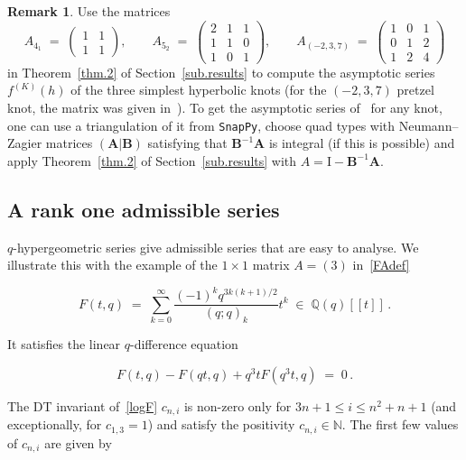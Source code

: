 \documentclass[12pt,reqno]{amsart}
\theoremstyle{definition}
\newtheorem{remark}[proposition]{Remark}
\def\BN{\mathbb N}
\def\BQ{\mathbb Q}
\def\be{\begin{equation}}
\def\ee{\end{equation}}
\def\={\;=\;}
\def\inn{\;\in\;}
\def\Phitof{f}
\begin{document}
\begin{remark}
\label{rem.knots}
Use the matrices
\be
\label{3knots}
A_{4_1} \= \begin{pmatrix} 1 & 1 \\ 1 & 1 \end{pmatrix},
\qquad
A_{5_2} \= \begin{pmatrix} 2 & 1 & 1 \\ 1 & 1 & 0 \\ 1 & 0 & 1 \end{pmatrix},
\qquad
A_{(-2,3,7)} \=
\begin{pmatrix} 1 & 0 & 1 \\ 0 & 1 & 2 \\ 1 & 2 & 4 \end{pmatrix}
\ee
in Theorem~\ref{thm.2} of Section~\ref{sub.results} to compute the asymptotic
series $\Phitof^{(K)}(h)$ of the three simplest hyperbolic knots (for the $(-2,3,7)$
pretzel knot, the matrix was given in~\cite[Rem.A.5]{GZ:qseries}). To get the
asymptotic series of~\cite{DG} for any knot, one can use a triangulation of it
from \texttt{SnapPy}, choose quad types with Neumann--Zagier matrices
$(\mathbf A|\mathbf B)$ satisfying that $\mathbf B^{-1} \mathbf A$ is integral
(if this is possible) and apply Theorem~\ref{thm.2} of Section~\ref{sub.results}
with $A=\mathrm{I}- \mathbf B^{-1} \mathbf A$. 
\end{remark}

\subsection{A rank one admissible series}
\label{sub.F3}

$q$-hypergeometric series give admissible series that are easy to analyse. We
illustrate this with the example of the $1 \times 1$ matrix $A=(3)$ in~\eqref{FAdef}

\be
\label{Fexdef}
F(t,q) \= \sum_{k=0}^\infty \frac{(-1)^k q^{3 k(k+1)/2}}{(q;q)_k} t^k
\inn \BQ(q)[\![t]\!] \,.
\ee


It satisfies the linear $q$-difference equation 

\be
\label{Frec}
F(t,q) - F(q t,q) + q^3 t F(q^3 t,q) \= 0 \,.
\ee

The DT invariant of~\eqref{logF} $c_{n,i}$ is non-zero only for
$3n+1 \leq i \leq n^2+n+1$ (and exceptionally, for $c_{1,3}=1$) and satisfy the
positivity $c_{n,i} \in \BN$. The first few values of $c_{n,i}$ are given by
\end{document}
